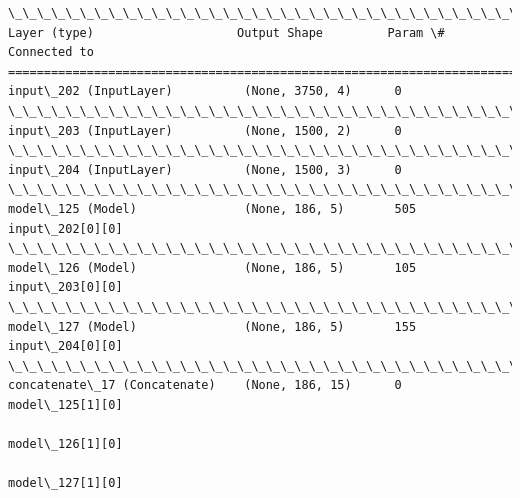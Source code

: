 \documentclass[11pt]{article}
\begin{document}
    \begin{Verbatim}[commandchars=\\\{\}]
\_\_\_\_\_\_\_\_\_\_\_\_\_\_\_\_\_\_\_\_\_\_\_\_\_\_\_\_\_\_\_\_\_\_\_\_\_\_\_\_\_\_\_\_\_\_\_\_\_\_\_\_\_\_\_\_\_\_\_\_\_\_\_\_\_\_\_\_\_\_\_\_\_\_\_\_\_\_\_\_\_\_\_\_\_\_\_\_\_\_\_\_\_\_\_\_\_\_
Layer (type)                    Output Shape         Param \#     Connected to                     
==================================================================================================
input\_202 (InputLayer)          (None, 3750, 4)      0                                            
\_\_\_\_\_\_\_\_\_\_\_\_\_\_\_\_\_\_\_\_\_\_\_\_\_\_\_\_\_\_\_\_\_\_\_\_\_\_\_\_\_\_\_\_\_\_\_\_\_\_\_\_\_\_\_\_\_\_\_\_\_\_\_\_\_\_\_\_\_\_\_\_\_\_\_\_\_\_\_\_\_\_\_\_\_\_\_\_\_\_\_\_\_\_\_\_\_\_
input\_203 (InputLayer)          (None, 1500, 2)      0                                            
\_\_\_\_\_\_\_\_\_\_\_\_\_\_\_\_\_\_\_\_\_\_\_\_\_\_\_\_\_\_\_\_\_\_\_\_\_\_\_\_\_\_\_\_\_\_\_\_\_\_\_\_\_\_\_\_\_\_\_\_\_\_\_\_\_\_\_\_\_\_\_\_\_\_\_\_\_\_\_\_\_\_\_\_\_\_\_\_\_\_\_\_\_\_\_\_\_\_
input\_204 (InputLayer)          (None, 1500, 3)      0                                            
\_\_\_\_\_\_\_\_\_\_\_\_\_\_\_\_\_\_\_\_\_\_\_\_\_\_\_\_\_\_\_\_\_\_\_\_\_\_\_\_\_\_\_\_\_\_\_\_\_\_\_\_\_\_\_\_\_\_\_\_\_\_\_\_\_\_\_\_\_\_\_\_\_\_\_\_\_\_\_\_\_\_\_\_\_\_\_\_\_\_\_\_\_\_\_\_\_\_
model\_125 (Model)               (None, 186, 5)       505         input\_202[0][0]                  
\_\_\_\_\_\_\_\_\_\_\_\_\_\_\_\_\_\_\_\_\_\_\_\_\_\_\_\_\_\_\_\_\_\_\_\_\_\_\_\_\_\_\_\_\_\_\_\_\_\_\_\_\_\_\_\_\_\_\_\_\_\_\_\_\_\_\_\_\_\_\_\_\_\_\_\_\_\_\_\_\_\_\_\_\_\_\_\_\_\_\_\_\_\_\_\_\_\_
model\_126 (Model)               (None, 186, 5)       105         input\_203[0][0]                  
\_\_\_\_\_\_\_\_\_\_\_\_\_\_\_\_\_\_\_\_\_\_\_\_\_\_\_\_\_\_\_\_\_\_\_\_\_\_\_\_\_\_\_\_\_\_\_\_\_\_\_\_\_\_\_\_\_\_\_\_\_\_\_\_\_\_\_\_\_\_\_\_\_\_\_\_\_\_\_\_\_\_\_\_\_\_\_\_\_\_\_\_\_\_\_\_\_\_
model\_127 (Model)               (None, 186, 5)       155         input\_204[0][0]                  
\_\_\_\_\_\_\_\_\_\_\_\_\_\_\_\_\_\_\_\_\_\_\_\_\_\_\_\_\_\_\_\_\_\_\_\_\_\_\_\_\_\_\_\_\_\_\_\_\_\_\_\_\_\_\_\_\_\_\_\_\_\_\_\_\_\_\_\_\_\_\_\_\_\_\_\_\_\_\_\_\_\_\_\_\_\_\_\_\_\_\_\_\_\_\_\_\_\_
concatenate\_17 (Concatenate)    (None, 186, 15)      0           model\_125[1][0]                  
                                                                 model\_126[1][0]                  
                                                                 model\_127[1][0]                  

\end{Verbatim}
\end{document}
